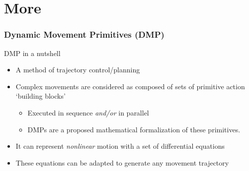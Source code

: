 \documentclass[aspectratio=43,11pt,xcolor={dvipsnames}]{beamer}
\begin{document}

\appendix
\section{More}
\begin{frame}[noframenumbering,label=supplemental]
	\frametitle{Dynamic Movement Primitives (DMP)}
	\linespread{1.2}
									
	\begin{exampleblock}{DMP in a nutshell}
		\begin{itemize}
			\item A method of trajectory control/planning\footnotemark
			\item Complex movements are considered as composed of sets of primitive action ‘building blocks’
			      \begin{itemize}
			      	\item Executed in sequence \textit{and/or} in parallel
			      	\item DMPs are a proposed mathematical formalization of these primitives.
			      \end{itemize}
			\item It can represent \textit{nonlinear} motion with a set of differential equations
			\item These equations can be adapted to generate any movement trajectory
		\end{itemize}
	\end{exampleblock}
	
\end{frame}
\end{document}
